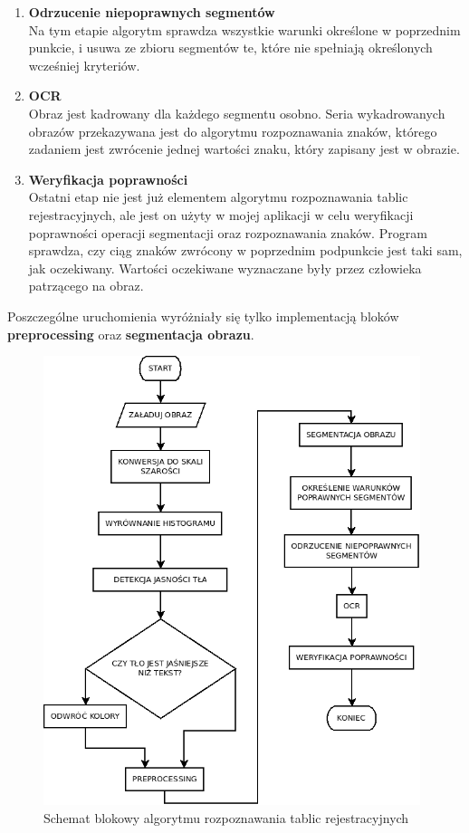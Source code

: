 \begin{enumerate}
    \item \textbf{Odrzucenie niepoprawnych segmentów}\\
      Na tym etapie algorytm sprawdza wszystkie warunki określone w poprzednim punkcie, i usuwa ze zbioru segmentów te, które nie spełniają określonych wcześniej kryteriów.
    \item \textbf{OCR}\\
      Obraz jest kadrowany dla każdego segmentu osobno. Seria wykadrowanych obrazów przekazywana jest do algorytmu rozpoznawania znaków, którego zadaniem jest zwrócenie jednej wartości znaku, który zapisany jest w obrazie.
    \item \textbf{Weryfikacja poprawności}\\
      Ostatni etap nie jest już elementem algorytmu rozpoznawania tablic rejestracyjnych, ale jest on użyty w mojej aplikacji w celu weryfikacji poprawności operacji segmentacji oraz rozpoznawania znaków. Program sprawdza, czy ciąg znaków zwrócony w poprzednim podpunkcie jest taki sam, jak oczekiwany. Wartości oczekiwane wyznaczane były przez człowieka patrzącego na obraz.
\end{enumerate}
Poszczególne uruchomienia wyróżniały się tylko implementacją bloków \textbf{preprocessing} oraz \textbf{segmentacja obrazu}.
\begin{figure}
  \centering
  \includegraphics[width=0.98\textwidth]{img/main-flowchart}
  \caption{Schemat blokowy algorytmu rozpoznawania tablic rejestracyjnych}
  \label{fig:main_flowchart}
\end{figure}

